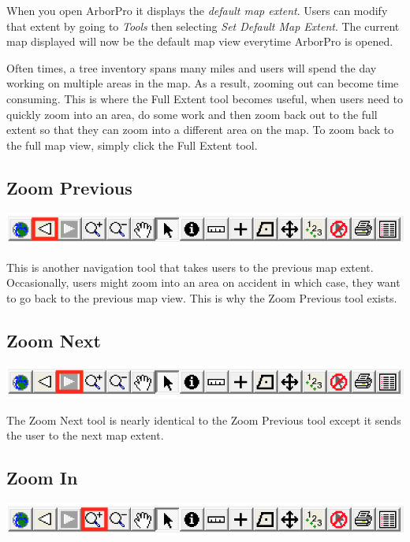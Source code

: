 \documentclass[]{book}
\begin{document}
When you open ArborPro it displays the \emph{default map extent}. Users
can modify that extent by going to \emph{Tools} then selecting \emph{Set
Default Map Extent}. The current map displayed will now be the default
map view everytime ArborPro is opened.

Often times, a tree inventory spans many miles and users will spend the
day working on multiple areas in the map. As a result, zooming out can
become time consuming. This is where the Full Extent tool becomes
useful, when users need to quickly zoom into an area, do some work and
then zoom back out to the full extent so that they can zoom into a
different area on the map. To zoom back to the full map view, simply
click the Full Extent tool.

\hypertarget{zoom-previous}{%
\subsection{Zoom Previous}\label{zoom-previous}}

\includegraphics[width=10.36in]{images/toolbar-back-view}

This is another navigation tool that takes users to the previous map
extent. Occasionally, users might zoom into an area on accident in which
case, they want to go back to the previous map view. This is why the
Zoom Previous tool exists.

\hypertarget{zoom-next}{%
\subsection{Zoom Next}\label{zoom-next}}

\includegraphics[width=10.36in]{images/toolbar-forward-view}

The Zoom Next tool is nearly identical to the Zoom Previous tool except
it sends the user to the next map extent.

\hypertarget{zoom-in}{%
\subsection{Zoom In}\label{zoom-in}}

\includegraphics[width=10.36in]{images/toolbar-zoom-in}
\end{document}
